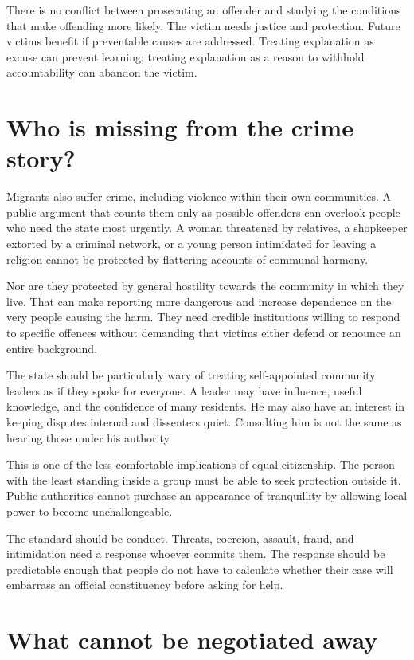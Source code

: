 \documentclass[12pt,a4paper]{book}
\begin{document}
There is no conflict between prosecuting an offender and studying the conditions that make offending more likely. The victim needs justice and protection. Future victims benefit if preventable causes are addressed. Treating explanation as excuse can prevent learning; treating explanation as a reason to withhold accountability can abandon the victim.

\section*{Who is missing from the crime story?}

Migrants also suffer crime, including violence within their own communities. A public argument that counts them only as possible offenders can overlook people who need the state most urgently. A woman threatened by relatives, a shopkeeper extorted by a criminal network, or a young person intimidated for leaving a religion cannot be protected by flattering accounts of communal harmony.

Nor are they protected by general hostility towards the community in which they live. That can make reporting more dangerous and increase dependence on the very people causing the harm. They need credible institutions willing to respond to specific offences without demanding that victims either defend or renounce an entire background.

The state should be particularly wary of treating self-appointed community leaders as if they spoke for everyone. A leader may have influence, useful knowledge, and the confidence of many residents. He may also have an interest in keeping disputes internal and dissenters quiet. Consulting him is not the same as hearing those under his authority.

This is one of the less comfortable implications of equal citizenship. The person with the least standing inside a group must be able to seek protection outside it. Public authorities cannot purchase an appearance of tranquillity by allowing local power to become unchallengeable.

The standard should be conduct. Threats, coercion, assault, fraud, and intimidation need a response whoever commits them. The response should be predictable enough that people do not have to calculate whether their case will embarrass an official constituency before asking for help.

\section*{What cannot be negotiated away}
\end{document}
